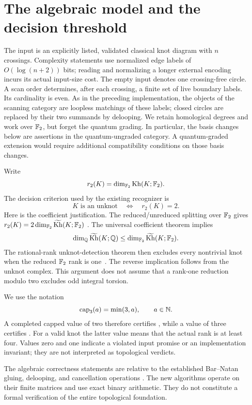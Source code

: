 \section{The algebraic model and the decision threshold}
\label{sec:algebraic-model}

The input is an explicitly listed, validated classical knot diagram with
$n$ crossings. Complexity statements use normalized edge labels of
$O(\log(n+2))$ bits; reading and normalizing a longer external encoding
incurs its actual input-size cost. The empty input denotes one
crossing-free circle. A scan
order determines, after each crossing, a finite set of live boundary
labels. Its cardinality is even. As in the preceding implementation, the
objects of the scanning category are loopless matchings of these labels;
closed circles are replaced by their two summands by delooping. We retain
homological degrees and work over $\mathbb F_2$, but forget the quantum grading.
In particular, the basis changes below are assertions in the
quantum-ungraded category. A quantum-graded extension would require
additional compatibility conditions on those basis changes.

Write
\[
 r_2(K)=\dim_{\mathbb F_2}\operatorname{Kh}(K;\mathbb F_2).
\]
The decision criterion used by the existing recognizer is
\begin{equation}\label{eq:rank-two}
 K\text{ is an unknot}\quad\Longleftrightarrow\quad r_2(K)=2.
\end{equation}
Here is the coefficient justification. The reduced/unreduced splitting
over $\mathbb F_2$ gives $r_2(K)=2\dim_{\mathbb F_2}\widetilde{\operatorname{Kh}}(K;\mathbb F_2)$
\cite{shumakovitch}. The universal coefficient theorem implies
\[
 \dim_{\mathbb Q}\widetilde{\operatorname{Kh}}(K;\mathbb Q)\le\dim_{\mathbb F_2}\widetilde{\operatorname{Kh}}(K;\mathbb F_2).
\]
The rational-rank unknot-detection theorem then excludes every nontrivial
knot when the reduced $\mathbb F_2$ rank is one~\cite{km}. The reverse implication
follows from the unknot complex. This argument does not assume that a
rank-one reduction modulo two excludes odd integral torsion.

We use the notation
\[
 \operatorname{cap}_3(a)=\min(3,a),\qquad a\in\mathbb N.
\]
A completed capped value of two therefore certifies \UNKNOT, while a
value of three certifies \KNOTTED. For a valid knot the latter value means
that the actual rank is at least four. Values zero and one indicate a
violated input promise or an implementation invariant; they are not
interpreted as topological verdicts.

The algebraic correctness statements are relative to the established
Bar--Natan gluing, delooping, and cancellation operations
\cite{khovanov,barnatan}. The new algorithms operate on their finite
matrices and use exact binary arithmetic. They do not constitute a formal
verification of the entire topological foundation.

